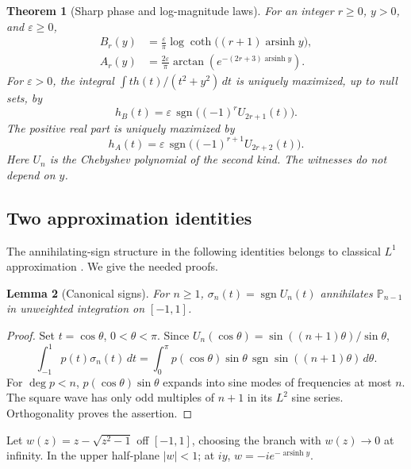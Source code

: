 \documentclass[11pt]{article}
\newtheorem{theorem}{Theorem}[section]
\newtheorem{lemma}[theorem]{Lemma}
\theoremstyle{remark}\newtheorem{remark}[theorem]{Remark}
\newcommand{\eps}{\varepsilon}
\newcommand{\sgn}{\operatorname{sgn}}
\newcommand{\asinh}{\operatorname{arsinh}}
\begin{document}
\begin{theorem}[Sharp phase and log-magnitude laws]\label{thm:main}
For an integer $r\geq0$, $y>0$, and $\eps\geq0$,
\begin{align}
 B_r(y)&=\frac{\eps}{\pi}\log\coth\big((r+1)\asinh y\big),
       \label{eq:phase}\\
 A_r(y)&=\frac{2\eps}{\pi}
       \arctan\!\left(e^{-(2r+3)\asinh y}\right).
       \label{eq:gain}
\end{align}
For $\eps>0$, the integral $\int th(t)/(t^2+y^2)\,dt$ is uniquely maximized,
up to null sets, by
\begin{equation}\label{eq:phasewitness}
 h_B(t)=\eps\,\sgn\!\big((-1)^r U_{2r+1}(t)\big).
\end{equation}
The positive real part is uniquely maximized by
\begin{equation}\label{eq:gainwitness}
 h_A(t)=\eps\,\sgn\!\big((-1)^{r+1} U_{2r+2}(t)\big).
\end{equation}
Here $U_n$ is the Chebyshev polynomial of the second kind.
The witnesses do not depend on $y$.
\end{theorem}

\subsection{Two approximation identities}
The annihilating-sign structure in the following identities belongs to
classical $L^1$ approximation \cite{hobby,nakatsukasa}.
We give the needed proofs.

\begin{lemma}[Canonical signs]\label{lem:sign}
For $n\geq1$, $\sigma_n(t)=\sgn U_n(t)$ annihilates $\mathbb P_{n-1}$
in unweighted integration on $[-1,1]$.
\end{lemma}
\begin{proof}
Set $t=\cos\theta$, $0<\theta<\pi$. Since
$U_n(\cos\theta)=\sin((n+1)\theta)/\sin\theta$,
\[
 \int_{-1}^{1}p(t)\sigma_n(t)\,dt
 =\int_0^\pi p(\cos\theta)\sin\theta\,
             \sgn\sin((n+1)\theta)\,d\theta.
\]
For $\deg p<n$, $p(\cos\theta)\sin\theta$ expands into sine modes of
frequencies at most $n$. The square wave has only odd multiples of $n+1$
in its $L^2$ sine series. Orthogonality proves the assertion.
\end{proof}

Let $w(z)=z-\sqrt{z^2-1}$ off $[-1,1]$, choosing the branch with
$w(z)\to0$ at infinity. In the upper half-plane $|w|<1$;
at $iy$, $w=-i e^{-\asinh y}$.
\end{document}
